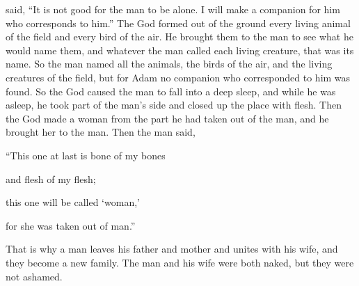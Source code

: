 {said,
“It is not
good
for the man
to be alone.
I will make
a companion for him
who corresponds to him.”
The
{}
God
formed
out
of the ground
every
living
animal of the field
and every
bird
of the air.
He brought
them to
the man
to see
what
he would name
them, and whatever
the man
called
each living creature,
that was
its name.
So
the man
named
all
the animals,
the birds
of the air,
and the living creatures
of the field,
but for Adam
no
companion who
corresponded to him
was found.
So the
{}
God
caused the man
to fall
into a deep sleep,
and while he was asleep,
he took
part of the man’s
side
and closed up
the place
with flesh.
Then
the {}
God
made a woman
from
the part
he had
taken
out
of the man,
and he brought
her to
the man.
Then the man
said,
\par }{\Q “This
one at last
is bone
of my bones
\par }{\Q and flesh
of my flesh;
\par }{\Q this
one will be called ‘woman,’
\par }{\Q for
she was taken
out of man.”
\par }{\PP {}That is why
a man
leaves
his father
and mother
and unites
with his wife,
and they become a new family.
The man
and his wife
were both
naked,
but they were not
ashamed.

}
